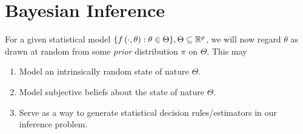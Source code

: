 \documentclass[a4paper]{article}
\begin{document}
\section{Bayesian Inference}

For a given statistical model $\{f\left( \cdot , \theta \right) : \theta \in \Theta \}, \Theta \subseteq \mathbb{R}^{p}$, we will now regard $\theta$ as drawn at random from some \textit{prior} distribution $\pi$ on $\Theta$. This may

\begin{enumerate}[label=\roman*)]
	\item Model an intrinsically random state of nature $\Theta$.
	\item Model subjective beliefs about the state of nature $\Theta$.
	\item Serve as a way to generate statistical decision rules/estimators in our inference problem.
\end{enumerate}
\end{document}
